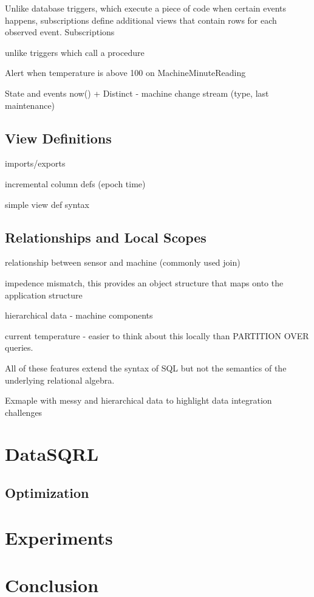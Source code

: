 \documentclass[	DIV=calc,%
							paper=letter,%
							fontsize=11pt,%
							twocolumn]{scrartcl}	 					%
\begin{document}
Unlike database triggers, which execute a piece of code when certain events happens, subscriptions define additional views that contain rows for each observed event. Subscriptions

unlike triggers which call a procedure

Alert when temperature is above 100 on MachineMinuteReading


State and events
now() + Distinct - machine change stream (type, last maintenance)

\subsection{View Definitions}

imports/exports

incremental column defs (epoch time)

simple view def syntax

\subsection{Relationships and Local Scopes}

relationship between sensor and machine (commonly used join)

impedence mismatch, this provides an object structure that maps onto the application structure

hierarchical data - machine components

current temperature - easier to think about this locally than PARTITION OVER queries.






All of these features extend the syntax of SQL but not the semantics of the underlying relational algebra.



Exmaple with messy and hierarchical data to highlight data integration challenges

\section{DataSQRL}
\label{sec:datasqrl}

\subsection{Optimization}
\label{sec:optimization}


\section{Experiments}
\label{sec:experiments}

\section{Conclusion}
\label{sec:conclusion}
\end{document}
